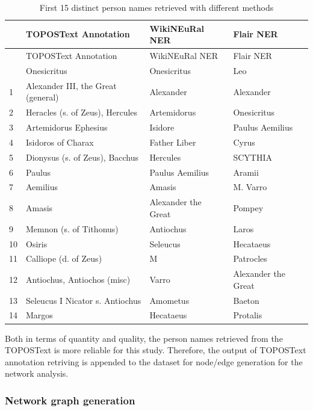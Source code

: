 \documentclass[
  12pt,
]{article}
\begin{document}
\hypertarget{tbl-per_name_compare}{}
\begin{longtable}[]{@{}llll@{}}
\caption{\label{tbl-per_name_compare}First 15 distinct person names
retrieved with different methods}\tabularnewline
\toprule\noalign{}
& TOPOSText Annotation & WikiNEuRal NER & Flair NER \\
\midrule\noalign{}
\endfirsthead
\toprule\noalign{}
& TOPOSText Annotation & WikiNEuRal NER & Flair NER \\
\midrule\noalign{}
\endhead
\bottomrule\noalign{}
\endlastfoot
0 & Onesicritus & Onesicritus & Leo \\
1 & Alexander III, the Great (general) & Alexander & Alexander \\
2 & Heracles (s. of Zeus), Hercules & Artemidorus & Onesicritus \\
3 & Artemidorus Ephesius & Isidore & Paulus Aemilius \\
4 & Isidoros of Charax & Father Liber & Cyrus \\
5 & Dionysus (s. of Zeus), Bacchus & Hercules & SCYTHIA \\
6 & Paulus & Paulus Aemilius & Aramii \\
7 & Aemilius & Amasis & M. Varro \\
8 & Amasis & Alexander the Great & Pompey \\
9 & Memnon (s. of Tithonus) & Antiochus & Laros \\
10 & Osiris & Seleucus & Hecataeus \\
11 & Calliope (d. of Zeus) & M & Patrocles \\
12 & Antiochus, Antiochos (misc) & Varro & Alexander the Great \\
13 & Seleucus I Nicator s. Antiochus & Amometus & Baeton \\
14 & Margos & Hecataeus & Protalis \\
\end{longtable}

Both in terms of quantity and quality, the person names retrieved from
the TOPOSText is more reliable for this study. Therefore, the output of
TOPOSText annotation retriving is appended to the dataset for node/edge
generation for the network analysis.

\hypertarget{network-graph-generation}{%
\subsubsection{Network graph
generation}\label{network-graph-generation}}
\end{document}
